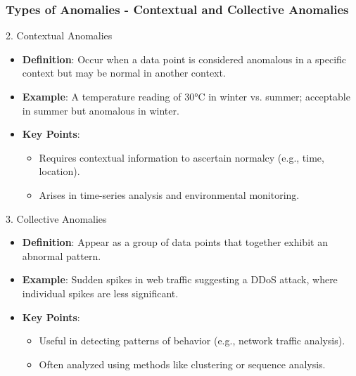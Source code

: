 \documentclass{beamer}
\begin{document}
\begin{frame}[fragile]
    \frametitle{Types of Anomalies - Contextual and Collective Anomalies}
    \begin{block}{2. Contextual Anomalies}
        \begin{itemize}
            \item \textbf{Definition}: Occur when a data point is considered anomalous in a specific context but may be normal in another context.
            \item \textbf{Example}: A temperature reading of 30°C in winter vs. summer; acceptable in summer but anomalous in winter.
            \item \textbf{Key Points}:
            \begin{itemize}
                \item Requires contextual information to ascertain normalcy (e.g., time, location).
                \item Arises in time-series analysis and environmental monitoring.
            \end{itemize}
        \end{itemize}
    \end{block}
    
    \begin{block}{3. Collective Anomalies}
        \begin{itemize}
            \item \textbf{Definition}: Appear as a group of data points that together exhibit an abnormal pattern.
            \item \textbf{Example}: Sudden spikes in web traffic suggesting a DDoS attack, where individual spikes are less significant.
            \item \textbf{Key Points}:
            \begin{itemize}
                \item Useful in detecting patterns of behavior (e.g., network traffic analysis).
                \item Often analyzed using methods like clustering or sequence analysis.
            \end{itemize}
        \end{itemize}
    \end{block}
\end{frame}
\end{document}
